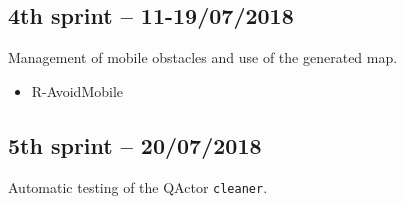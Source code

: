 \subsection{4th sprint -- 11-19/07/2018}
Management of mobile obstacles and use of the generated map.

\begin{itemize}
	\ttfamily
	\item R-AvoidMobile
\end{itemize}

\subsection{5th sprint -- 20/07/2018}
Automatic testing of the QActor \texttt{cleaner}.


